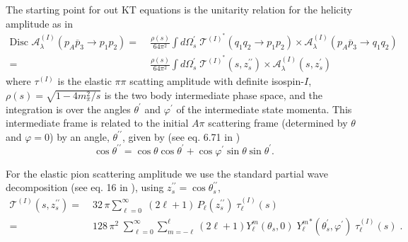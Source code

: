 \documentclass[10pt, aps,prd,amsmath,amssymb,superscriptaddress,onecolumn,
nofootinbib,showpacs,preprintnumbers]{revtex4-1}
\newcommand{\Disc}{\text{Disc }}
\begin{document}
The starting point for out KT equations is the unitarity relation for the helicity amplitude as in \cite{Danilkin:2014cra}
  \begin{align}
    \label{eq:unitarity}
    \Disc \mathcal{A}^{(I)}_\lambda(p_A \overline{p}_3 \to p_1 p_2 ) =&\; \frac{\rho(s)}{64 \pi^2} \int d\Omega_s^\prime  \; {\mathcal{T}}^{(I)^*}(q_1q_2 \to p_1p_2) \times \mathcal{A}^{(I)}_\lambda(p_A \overline{p}_{3} \to q_1 q_2 ) \nonumber \\
    =& \; \frac{\rho(s)}{64 \pi^2} \int d\Omega_s^\prime  \; {\mathcal{T}}^{(I)^*}(s,z_s^{\prime\prime}) \times \mathcal{A}^{(I)}_\lambda(s,z_s^{\prime})
  \end{align}
where \({\tau^{(I)}}\) is the elastic \(\pi\pi\) scatting amplitude with definite isospin-\(I\), \(\rho(s) = \sqrt{1 - 4m_\pi^2/s}\) is the two body intermediate phase space, and the integration is over the angles \(\theta^\prime\) and \(\varphi^\prime\) of the intermediate state momenta. This intermediate frame is related to the initial \(A\pi\) scattering frame (determined by \(\theta\) and \(\varphi = 0\)) by an angle, \(\theta^{\prime\prime}\), given by (see eq. 6.71 in \cite{MS})
  \begin{equation}
    \cos \theta^{\prime\prime} = \cos \theta \cos \theta^\prime + \cos \varphi^\prime \sin\theta \sin \theta^\prime.
  \end{equation}

For the elastic pion scattering amplitude we use the standard partial wave decomposition (see eq. 16 in \cite{Danilkin:2014cra}), using \( z_s^{\prime\prime} = \cos \theta_s^{\prime\prime}\),
  \begin{align}
    \label{eq:elastic-pion}
    \mathcal{T}^{(I)}(s, z_s^{\prime\prime}) =& \; 32 \, \pi \sum_{\ell=0  }^\infty \; (2\ell+1) \, P_{\ell}(z_s^{\prime\prime}) \; \tau_\ell^{(I)}(s) \nonumber \\
    =& \; 128 \, \pi^2 \; \sum_{\ell=0}^\infty \sum_{m=-\ell}^{\ell} (2\ell +1 ) Y^m_\ell(\theta_s,0) \; {Y^m_\ell}^*(\theta_s^\prime, \varphi^\prime) \; \tau_\ell^{(I)}(s) \; .
  \end{align}
\end{document}
